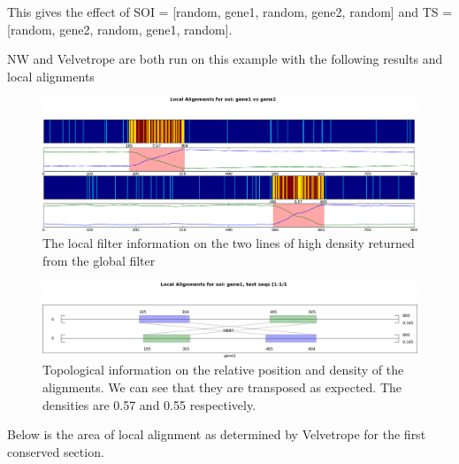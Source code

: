 \documentclass[phd,tocprelim]{cornell}
\begin{document}
This gives the effect of SOI = [random, gene1, random, gene2, random] and TS = [random, gene2, random, gene1, random].

NW and Velvetrope are both run on this example with the following results and local alignments

\begin{figure}[hpt]
	\centering
		\includegraphics[width=1.0\textwidth]{figures/velvetrope/path1_1.png}
        \caption[Local Velvetrope filter for NW trasposition test]{The local filter information on the two lines of high density returned from the global filter}
	\label{fig:07}
\end{figure}

\begin{figure}[hpt]
	\centering
		\includegraphics[width=1.0\textwidth]{figures/velvetrope/path1_2.png}
	\caption[Topological information of NW transposition test]{Topological information on the relative position and density of the alignments. We can see that they are transposed as expected. The densities are 0.57 and 0.55 respectively.}
	\label{fig:08}
\end{figure}

Below is the area of local alignment as determined by Velvetrope for the first conserved section.
\end{document}
